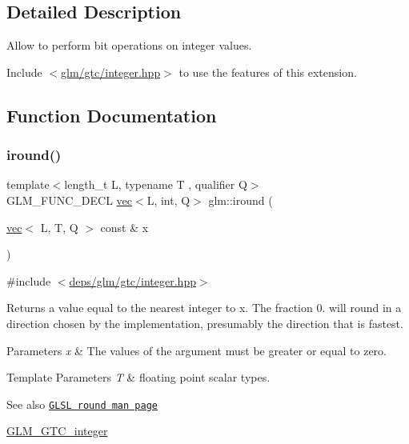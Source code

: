 \subsection{Detailed Description}
Allow to perform bit operations on integer values. 

Include $<$\hyperlink{gtc_2integer_8hpp}{glm/gtc/integer.\+hpp}$>$ to use the features of this extension. 

\subsection{Function Documentation}
\mbox{\label{group__gtc__integer_ga57824268ebe13a922f1d69a5d37f637f}} 
\subsubsection{\texorpdfstring{iround()}{iround()}}
{\footnotesize\ttfamily template$<$length\+\_\+t L, typename T , qualifier Q$>$ \\
G\+L\+M\+\_\+\+F\+U\+N\+C\+\_\+\+D\+E\+CL \hyperlink{structglm_1_1vec}{vec}$<$L, int, Q$>$ glm\+::iround (\begin{DoxyParamCaption}\item[{\hyperlink{structglm_1_1vec}{vec}$<$ L, T, Q $>$ const \&}]{x }\end{DoxyParamCaption})}



{\ttfamily \#include $<$\hyperlink{gtc_2integer_8hpp}{deps/glm/gtc/integer.\+hpp}$>$}

Returns a value equal to the nearest integer to x. The fraction 0. will round in a direction chosen by the implementation, presumably the direction that is fastest.


\begin{DoxyParams}{Parameters}
{\em x} & The values of the argument must be greater or equal to zero. \\
\hline
\end{DoxyParams}

\begin{DoxyTemplParams}{Template Parameters}
{\em T} & floating point scalar types.\\
\hline
\end{DoxyTemplParams}
\begin{DoxySeeAlso}{See also}
\href{http://www.opengl.org/sdk/docs/manglsl/xhtml/round.xml}{\tt G\+L\+SL round man page} 

\hyperlink{group__gtc__integer}{G\+L\+M\+\_\+\+G\+T\+C\+\_\+integer} 
\end{DoxySeeAlso}


